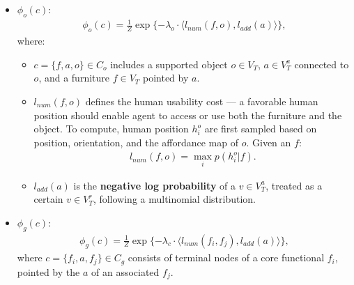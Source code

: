\documentclass[10pt]{article}
\begin{document}
\begin{itemize}
\begin{itemize}
\begin{figure}[!htpb]
        \end{figure}
    \end{itemize}
  \item  $\phi_o(c)$:
    \begin{align}
      \label{eq:7}
      \phi_o(c) = \frac{1}{Z} \exp\{-\lambda_o \cdot \langle l_{num}(f, o), l_{add}(a) \rangle\},
    \end{align}
    where:
    \begin{itemize}
      \item $c = \{f, a, o\} \in C_o$ includes a supported object $o \in V_T$,
        $a \in V^a_T$ connected to $o$, and a furniture $f \in V_T$ pointed by
        $a$.
      \item $l_{num}(f, o)$ defines the human usability cost --- a favorable
        human position should enable agent to access or use both the furniture
        and the object. To compute, human position $h^o_i$ are first sampled
        based on position, orientation, and the affordance map of $o$. Given an
        $f$:
        \begin{align}
          \label{eq:8}
          l_{num}(f, o) = \max_i p(h^o_i \vert f).
        \end{align}
      \item $l_{add}(a)$ is the \textbf{negative log probability} of a
        $v \in V^a_T$, treated as a certain $v \in V^r_T$, following a
        multinomial distribution.
    \end{itemize}
  \item $\phi_g(c)$:
    \begin{align}
      \label{eq:9}
      \phi_g(c) = \frac{1}{Z} \exp\{-\lambda_c \cdot \langle l_{num}(f_i, f_j), l_{add}(a) \rangle\},
    \end{align}
    where $c = \{f_i, a, f_j\} \in C_g$ consists of terminal nodes of a core
    functional $f_i$, pointed by the $a$ of an associated $f_j$.
\end{itemize}
\end{document}
